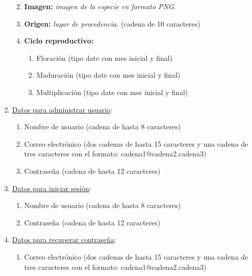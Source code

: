 \documentclass[10pt,a4paper]{article}
\begin{document}
\begin{enumerate}[label={RD\arabic*.} ,leftmargin=2.8\parindent]
\begin{enumerate}[label={RD5.\arabic*.}]
	\medskip	
	\item
		\textbf{Imagen:} \textit{imagen de la especie en formato PNG.}

	\medskip 
	\item
		\textbf{Origen:} \textit{lugar de procedencia.} (cadena de 10 caracteres)
		
	\medskip 
	\item
		\textbf{Ciclo reproductivo:}
	\begin{enumerate} [label=-]
		\item Floración (tipo date con mes inicial y final)
		\item Maduración (tipo date con mes inicial y final)
		\item Multiplicación (tipo date con mes inicial y final)
	\end{enumerate}				
	\medskip 
	\medskip
	\end{enumerate}
	
	\item \underline{Datos para administrar usuario}:
	\begin{enumerate}[label={RD6.\arabic*.}]
		\medskip
		\item Nombre de usuario (cadena de hasta 8 caracteres)
		\item Correo electrónico (dos cadenas de hasta 15 caracteres y una cadena de tres caracteres con el formato: cadena1@cadena2.cadena3)
		\item Contraseña (cadena de hasta 12 caracteres)
		\medskip \medskip
		\end{enumerate}

	\item \underline{Datos para iniciar sesión}:
	\begin{enumerate}[label={RD7.\arabic*.}]
		\medskip
		\item Nombre de usuario (cadena de hasta 8 caracteres)
		\item Contraseña (cadena de hasta 12 caracteres)
		\medskip \medskip
		\end{enumerate}

	\item \underline{Datos para recuperar contraseña}:
	\begin{enumerate}[label={RD8.\arabic*.}]
		\medskip
		\item Correo electrónico (dos cadenas de hasta 15 caracteres y una cadena de tres caracteres con el formato: cadena1@cadena2.cadena3)
		\medskip \medskip
		\end{enumerate}
		

\end{enumerate}
\end{document}
